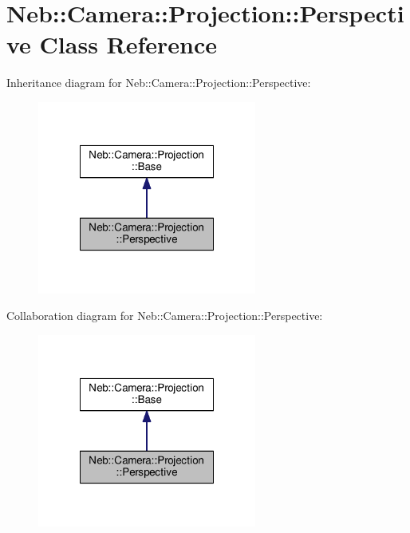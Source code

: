 \hypertarget{classNeb_1_1Camera_1_1Projection_1_1Perspective}{\section{Neb\-:\-:Camera\-:\-:Projection\-:\-:Perspective Class Reference}
\label{classNeb_1_1Camera_1_1Projection_1_1Perspective}
}


Inheritance diagram for Neb\-:\-:Camera\-:\-:Projection\-:\-:Perspective\-:
\nopagebreak
\begin{figure}[H]
\begin{center}
\leavevmode
\includegraphics[width=204pt]{classNeb_1_1Camera_1_1Projection_1_1Perspective__inherit__graph}
\end{center}
\end{figure}


Collaboration diagram for Neb\-:\-:Camera\-:\-:Projection\-:\-:Perspective\-:
\nopagebreak
\begin{figure}[H]
\begin{center}
\leavevmode
\includegraphics[width=204pt]{classNeb_1_1Camera_1_1Projection_1_1Perspective__coll__graph}
\end{center}
\end{figure}
